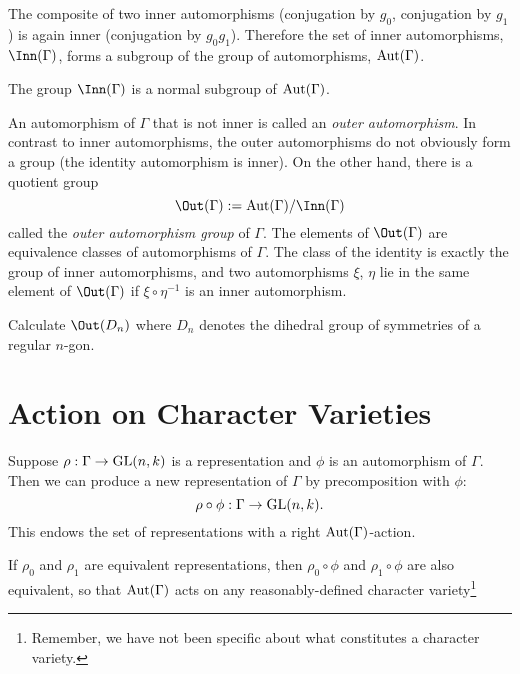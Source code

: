 \documentclass[11pt, oneside, usenames, dvipsnames, svgnames, table, draft]{amsart}
\begin{document}
The composite of two inner automorphisms (conjugation by $g_0$, conjugation by $g_1$) is again inner (conjugation by
$g_0 g_1$). Therefore the set of inner automorphisms, $\Inn(\Gamma)$, forms a subgroup of the group of automorphisms,
$\operatorname{Aut}(\Gamma)$.

\begin{exercise}
  The group $\Inn(\Gamma)$ is a normal subgroup of $\operatorname{Aut}(\Gamma)$.
\end{exercise}


An automorphism of $\Gamma$ that is not inner is called an \emph{outer automorphism}. In contrast to inner
automorphisms, the outer automorphisms do not obviously form a group (the identity automorphism is inner). On the other
hand, there is a quotient group
\[ \Out(\Gamma) : = \Aut(\Gamma)/\Inn(\Gamma) \]
called the \emph{outer automorphism group} of $\Gamma$. The elements of $\Out(\Gamma)$ are equivalence classes of
automorphisms of $\Gamma$. The class of the identity is exactly the group of inner automorphisms, and two automorphisms
$\xi$, $\eta$ lie in the same element of $\Out(\Gamma)$ if $\xi \circ \eta^{-1}$ is an inner automorphism.

\begin{exercise}
  Calculate $\Out(D_n)$ where $D_n$ denotes the dihedral group of symmetries of a regular $n$-gon.
\end{exercise}

\section{Action on Character Varieties}
\label{sec:acti-char-vari}

Suppose $\rho : \Gamma \to \operatorname{GL}(n,k)$ is a representation and $\phi$ is an automorphism of $\Gamma$. Then we can produce
a new representation of $\Gamma$ by precomposition with $\phi$:
\[ \rho \circ \phi : \Gamma \to \operatorname{GL}(n,k). \]
This endows the set of representations with a right $\operatorname{Aut}(\Gamma)$-action.

If $\rho_0$ and $\rho_1$ are equivalent representations, then $\rho_0 \circ \phi$ and $\rho_1 \circ \phi$ are also
equivalent, so that $\operatorname{Aut}(\Gamma)$ acts on any reasonably-defined character variety\footnote{Remember, we have not been
  specific about what constitutes a character variety.}
\end{document}
